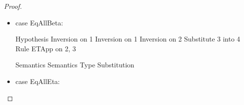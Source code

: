 \begin{proof}
\begin{itemize}
\begin{itemize}
  \begin{eqnproof}[\interpE{\judgeE{\Gamma, n:\N}{e}{A}}\;\theta\;(\gamma, s(k)) =]
          {Weakening}
          {Semantics}
          {Substitution}
  \end{eqnproof}
\end{itemize}

  These two are equal by appeal to the outer induction hypothesis, which we get via 
  inversion on the original judgement. 

\item case EqAllBeta: 

  \begin{eqnproof}
              {Hypothesis}
              {Inversion on 1}
    \eclaim[3]{\judgeWK{\tau}{\kappa}}
              {Inversion on 1}
              {Inversion on 2}
              {Substitute 3 into 4}
              {Rule ETApp on 2, 3}
  \end{eqnproof}

  \begin{eqnproof}[\interpE{\judgeE{\Gamma}{(\Fun{\alpha}{\kappa}{e})\;\tau}
                                   {[\tau/\alpha]A}}\;\theta\;\gamma = ]
          {Semantics}
          {Semantics}
          {}
          {Type Substitution}
  \end{eqnproof}

\item case EqAllEta:


\end{itemize}
\end{proof}
